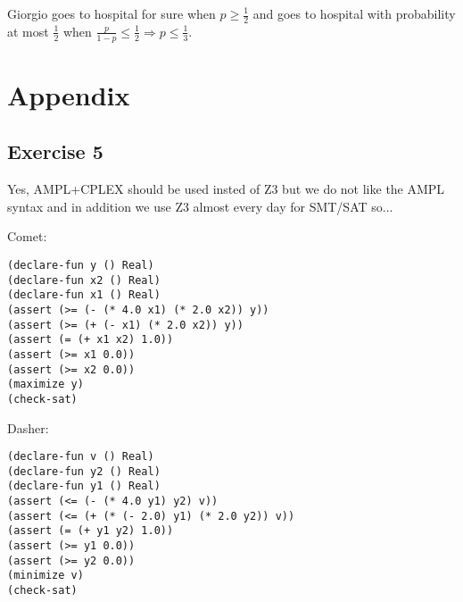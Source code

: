 \documentclass[paper=a4, fontsize=11pt]{scrartcl} %
\numberwithin{equation}{section} %
\numberwithin{figure}{section} %
\numberwithin{table}{section} %
\begin{document}
Giorgio goes to hospital for sure when $p \geq \frac{1}{2}$ and goes to hospital with probability at most $\frac{1}{2}$ when $\frac{p}{1-p} \leq \frac{1}{2} \Rightarrow p \leq \frac{1}{3}$.

\newpage
\section*{Appendix}

\subsection*{Exercise 5}
\label{ex5app}

Yes, AMPL+CPLEX should be used insted of Z3 but we do not like the AMPL syntax and in addition we use Z3 almost every day for SMT/SAT so...

\bigskip
Comet:
\begin{verbatim}
(declare-fun y () Real)
(declare-fun x2 () Real)
(declare-fun x1 () Real)
(assert (>= (- (* 4.0 x1) (* 2.0 x2)) y))
(assert (>= (+ (- x1) (* 2.0 x2)) y))
(assert (= (+ x1 x2) 1.0))
(assert (>= x1 0.0))
(assert (>= x2 0.0))
(maximize y)
(check-sat)
\end{verbatim}

Dasher:
\begin{verbatim}
(declare-fun v () Real)
(declare-fun y2 () Real)
(declare-fun y1 () Real)
(assert (<= (- (* 4.0 y1) y2) v))
(assert (<= (+ (* (- 2.0) y1) (* 2.0 y2)) v))
(assert (= (+ y1 y2) 1.0))
(assert (>= y1 0.0))
(assert (>= y2 0.0))
(minimize v)
(check-sat)
\end{verbatim}


\vfill
 

\end{document}
